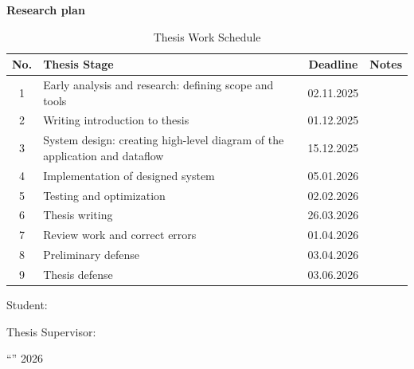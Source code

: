 \begin{center}
\textbf{\large Research plan}

\end{center}

\vspace{0.5cm}

\begin{center}
\begin{table}[H]
\centering
\caption{Thesis Work Schedule}
\label{tab:thesis_timeline}
\renewcommand{\arraystretch}{1.4}
\begin{tabular}{|c|p{}|c|p{}|}
\hline
\textbf{No.} & \textbf{Thesis Stage} & \textbf{Deadline} & \textbf{Notes} \\ 
\hline
1 & Early analysis and research: defining scope and tools & 02.11.2025 & \\ 
\hline
2 & Writing introduction to thesis & 01.12.2025 & \\ 
\hline
3 & System design: creating high-level diagram of the application and dataflow & 15.12.2025 & \\ 
\hline
4 & Implementation of designed system & 05.01.2026 & \\ 
\hline
5 & Testing and optimization & 02.02.2026 & \\ 
\hline
6 & Thesis writing & 26.03.2026 & \\ 
\hline
7 & Review work and correct errors & 01.04.2026 & \\ 
\hline
8 & Preliminary defense & 03.04.2026 & \\ 
\hline
9 & Thesis defense & 03.06.2026 & \\ 
\hline
\end{tabular}
\end{table}
\end{center}

\vspace{1cm}

\noindent Student: \authorname

\noindent Thesis Supervisor: \supname

\noindent ``\underline{\hspace{1cm}}'' \underline{\hspace{3cm}} 2026